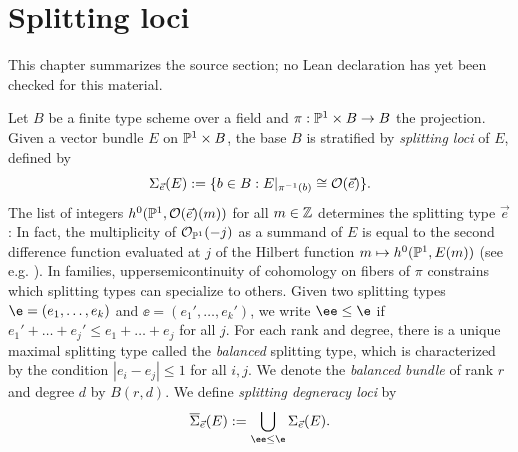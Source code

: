 \chapter{Splitting loci}
\label{refined-brill-noether-theory-hurwitz-spaces-chapter-02}

\begin{remark}
\label{refined-brill-noether-theory-hurwitz-spaces-chapter-02-source}
This chapter summarizes the source section; no Lean declaration has yet been
checked for this material.
\notready
\end{remark}

\label{split}
Let $B$ be a finite type scheme over a field and $\pi: \mathbb{P}^1 \times B \rightarrow B$ the projection.
Given a vector bundle $E$ on $\mathbb{P}^1 \times B$, the base $B$ is stratified by \textit{splitting loci} of $E$, defined by
\[\Sigma_{\vec{e}}(E) := \{b \in B : E|_{\pi^{-1}(b)} \cong \mathcal{O}(\vec{e})\}.\]
The list of integers $h^0(\mathbb{P}^1, \mathcal{O}(\vec{e})(m))$ for all $m \in \mathbb{Z}$ determines the splitting type $\vec{e}$: In fact, the multiplicity of $\mathcal{O}_{\mathbb{P}^1}(-j)$ as a summand of $E$ is equal to the second difference function evaluated at $j$ of the Hilbert function $m \mapsto h^0(\mathbb{P}^1, E(m))$ (see e.g. \cite[Lemma 5.6]{ES}).
In families, uppersemicontinuity of cohomology on fibers of $\pi$ constrains which splitting types can specialize to others. Given two splitting types $\e = (e_1, \ldots, e_k)$ and $\ee = (e_1', \ldots, e_k')$, we write $\ee \leq \e$ if $e_1'+\ldots + e_j' \leq e_1+\ldots+e_j$ for all $j$.
For each rank and degree, there is a unique maximal splitting type called the \textit{balanced} splitting type, which is characterized by the condition $|e_i - e_j| \leq 1$ for all $i, j$. We denote the \textit{balanced bundle} of rank $r$ and degree $d$ by $B(r, d)$.
We define \textit{splitting degneracy loci} by
\begin{equation} \label{u}\dcref{2.1}
\source{refined-brill-noether-theory-hurwitz-spaces}
\overline{\Sigma}_{\vec{e}}(E) := \bigcup_{\ee \leq \e} \Sigma_{\vec{e}}(E).
\end{equation}

